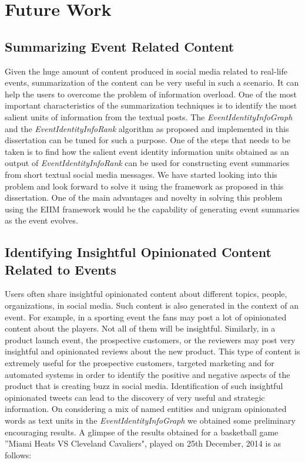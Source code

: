 \section{Future Work}

\subsection{Summarizing Event Related Content}
Given the huge amount of content produced in social media related to real-life events, summarization of the content can be very useful in such a scenario. It can help the users to overcome the problem of information overload. One of the most important characteristics of the summarization techniques is to identify the most salient units of information from the textual posts. The \textit{EventIdentityInfoGraph} and the \textit{EventIdentityInfoRank} algorithm as proposed and implemented in this dissertation can be tuned for such a purpose. One of the steps that needs to be taken is to find how the salient event identity information units obtained as an output of \textit{EventIdentityInfoRank} can be used for constructing event summaries from short textual social media messages. We have started looking into this problem and look forward to solve it using the framework as proposed in this dissertation. One of the main advantages and novelty in solving this problem using the EIIM framework would be the capability of generating event summaries as the event evolves. 

\subsection{Identifying Insightful Opinionated Content Related to Events}
Users often share insightful opinionated content about different topics, people, organizations, in social media. Such content is also generated in the context of an event. For example, in a sporting event the fans may post a lot of opinionated content about the players. Not all of them will be insightful. Similarly, in a product launch event, the prospective customers, or the reviewers may post very insightful and opinionated reviews about the new product. This type of content is extremely useful for the prospective customers, targeted marketing and for automated systems in order to identify the positive and negative aspects of the product that is creating buzz in social media. Identification of such insightful opinionated tweets can lead to the discovery of very useful and strategic information. On considering a mix of named entities and unigram opinionated words as text units in the \textit{EventIdentityInfoGraph} we obtained some preliminary encouraging results. A glimpse of the results obtained for a basketball game ''Miami Heats VS Cleveland Cavaliers", played on 25th December, 2014 is as follows:

